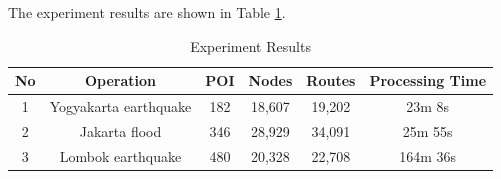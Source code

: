 \documentclass[conference]{IEEEtran}
\begin{document}
The experiment results are shown in Table \ref{table_experiment_results}.

\begin{table}[htbp]
\caption{Experiment Results}
\begin{center}
\begin{tabular}{|c|c|c|c|c|c|}
\hline
\textbf{No} & \textbf{Operation} & \textbf{POI} & \textbf{Nodes} & \textbf{Routes} & \textbf{Processing Time} \\
\hline
1 & Yogyakarta earthquake & 182 & 18,607 & 19,202 & 23m 8s \\
2 & Jakarta flood & 346 & 28,929 & 34,091 & 25m 55s \\
3 & Lombok earthquake & 480 & 20,328 & 22,708 & 164m 36s \\
\hline
\end{tabular}
\label{table_experiment_results}
\end{center}
\end{table}
\end{document}
